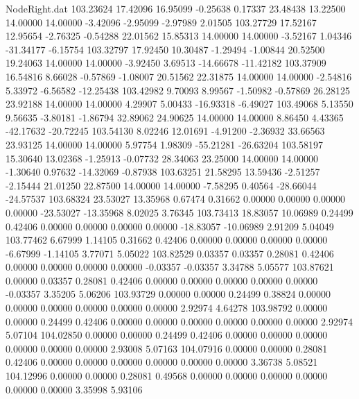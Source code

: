 \begin{filecontents}{NodeRight.dat}
 103.23624   17.42096   16.95099    -0.25638    0.17337   23.48438   13.22500   14.00000   14.00000   -3.42096   -2.95099   -2.97989    2.01505
 103.27729   17.52167   12.95654    -2.76325   -0.54288   22.01562   15.85313   14.00000   14.00000   -3.52167    1.04346  -31.34177   -6.15754
 103.32797   17.92450   10.30487    -1.29494   -1.00844   20.52500   19.24063   14.00000   14.00000   -3.92450    3.69513  -14.66678  -11.42182
 103.37909   16.54816    8.66028    -0.57869   -1.08007   20.51562   22.31875   14.00000   14.00000   -2.54816    5.33972   -6.56582  -12.25438
 103.42982    9.70093    8.99567    -1.50982   -0.57869   26.28125   23.92188   14.00000   14.00000    4.29907    5.00433  -16.93318   -6.49027
 103.49068    5.13550    9.56635    -3.80181   -1.86794   32.89062   24.90625   14.00000   14.00000    8.86450    4.43365  -42.17632  -20.72245
 103.54130    8.02246   12.01691    -4.91200   -2.36932   33.66563   23.93125   14.00000   14.00000    5.97754    1.98309  -55.21281  -26.63204
 103.58197   15.30640   13.02368    -1.25913   -0.07732   28.34063   23.25000   14.00000   14.00000   -1.30640    0.97632  -14.32069   -0.87938
 103.63251   21.58295   13.59436    -2.51257   -2.15444   21.01250   22.87500   14.00000   14.00000   -7.58295    0.40564  -28.66044  -24.57537
 103.68324   23.53027   13.35968     0.67474    0.31662    0.00000    0.00000    0.00000    0.00000  -23.53027  -13.35968    8.02025    3.76345
 103.73413   18.83057   10.06989     0.24499    0.42406    0.00000    0.00000    0.00000    0.00000  -18.83057  -10.06989    2.91209    5.04049
 103.77462    6.67999    1.14105     0.31662    0.42406    0.00000    0.00000    0.00000    0.00000   -6.67999   -1.14105    3.77071    5.05022
 103.82529    0.03357    0.03357     0.28081    0.42406    0.00000    0.00000    0.00000    0.00000   -0.03357   -0.03357    3.34788    5.05577
 103.87621    0.00000    0.03357     0.28081    0.42406    0.00000    0.00000    0.00000    0.00000    0.00000   -0.03357    3.35205    5.06206
 103.93729    0.00000    0.00000     0.24499    0.38824    0.00000    0.00000    0.00000    0.00000    0.00000    0.00000    2.92974    4.64278
 103.98792    0.00000    0.00000     0.24499    0.42406    0.00000    0.00000    0.00000    0.00000    0.00000    0.00000    2.92974    5.07104
 104.02850    0.00000    0.00000     0.24499    0.42406    0.00000    0.00000    0.00000    0.00000    0.00000    0.00000    2.93008    5.07163
 104.07916    0.00000    0.00000     0.28081    0.42406    0.00000    0.00000    0.00000    0.00000    0.00000    0.00000    3.36738    5.08521
 104.12996    0.00000    0.00000     0.28081    0.49568    0.00000    0.00000    0.00000    0.00000    0.00000    0.00000    3.35998    5.93106

\end{filecontents}
